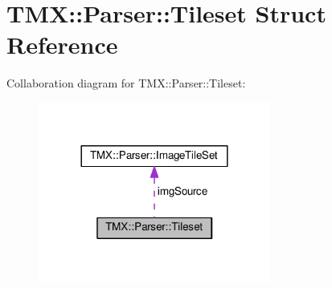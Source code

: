 \hypertarget{struct_t_m_x_1_1_parser_1_1_tileset}{}\section{T\+MX\+:\+:Parser\+:\+:Tileset Struct Reference}
\label{struct_t_m_x_1_1_parser_1_1_tileset}


Collaboration diagram for T\+MX\+:\+:Parser\+:\+:Tileset\+:\nopagebreak
\begin{figure}[H]
\begin{center}
\leavevmode
\includegraphics[width=216pt]{struct_t_m_x_1_1_parser_1_1_tileset__coll__graph}
\end{center}
\end{figure}
